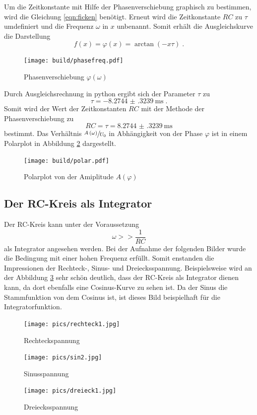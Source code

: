 Um die Zeitkonstante mit Hilfe der Phasenverschiebung graphisch zu bestimmen, wird die Gleichung \eqref{eqn:ficken} benötigt.
Erneut wird die Zeitkonstante $RC$ zu $\tau$ umdefiniert und die Frequenz $\omega$ in $x$ unbenannt.
Somit erhält die Ausgleichskurve die Darstellung 
\begin{equation}
    f \left( x \right) = \varphi \left ( x \right ) = \arctan \left( - x \tau \right) \;\text{.}
\end{equation}
\begin{figure}
    \centering
    \caption{Phasenverschiebung $\varphi \left ( \omega \right )$}
    \label{fig:phiw}
    \texttt{[image: build/phasefreq.pdf]}
\end{figure}
\noindent Durch Ausgleichsrechnung in python ergibt sich der Parameter $\tau$ zu 
\begin{equation*}
    \tau = \SI{-8.2744(3239)}{\milli\second} \; \text{.}
\end{equation*}
Somit wird der Wert der Zeitkonstanten $RC$ mit der Methode der Phasenverschiebung zu
\begin{equation*}
    RC =     \tau = \SI{8.2744(3239)}{\milli\second}
\end{equation*}
bestimmt. Das Verhältnis $\sfrac{A \left ( \omega \right )}{U_0}$ in Abhängigkeit von der Phase $\varphi$ ist in einem Polarplot in Abbildung \ref{fig:polar} dargestellt.
\begin{figure}
    \centering
    \caption{Polarplot von der Amiplitude $A \left( \varphi \right)$}
    \label{fig:polar}
    \texttt{[image: build/polar.pdf]}
\end{figure}
\newpage
\subsection{Der RC-Kreis als Integrator}
Der RC-Kreis kann unter der Voraussetzung 
\begin{equation}
     \omega >> \frac{1}{RC} 
\end{equation}
als Integrator angesehen  werden.
Bei der Aufnahme der folgenden Bilder wurde die Bedingung mit einer hohen Frequenz erfüllt.
Somit enstanden die Impressionen der Rechteck-, Sinus- und Dreiecksspannung.
Beispielsweise wird an der Abbildung \ref{fig:sin} sehr schön deutlich, dass der RC-Kreis als Integrator dienen kann, da dort ebenfalls eine Cosinus-Kurve 
zu sehen ist. Da der Sinus die Stammfunktion von dem Cosinus ist, ist dieses Bild beispielhaft für die Integratorfunktion.
\begin{figure}
        \centering
        \caption{Rechteckspannung}
        \texttt{[image: pics/rechteck1.jpg]}
\end{figure}
\begin{figure}
    \centering
    \caption{Sinusspannung}
    \label{fig:sin}
    \texttt{[image: pics/sin2.jpg]}
\end{figure}
\begin{figure}
    \centering
    \caption{Dreiecksspannung}
    \texttt{[image: pics/dreieck1.jpg]}
\end{figure}